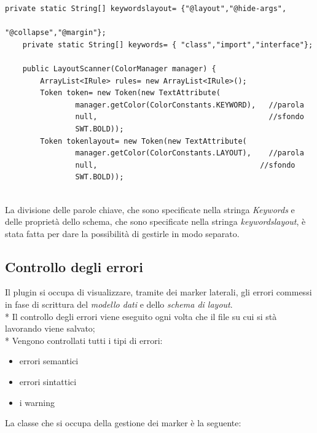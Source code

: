 \begin{lstlisting}[caption={LayoutScanner}, style={java}]
	private static String[] keywordslayout= {"@layout","@hide-args",
												"@collapse","@margin"};
	private static String[] keywords= { "class","import","interface"};
	
	public LayoutScanner(ColorManager manager) {
		ArrayList<IRule> rules= new ArrayList<IRule>();
		Token token= new Token(new TextAttribute(
				manager.getColor(ColorConstants.KEYWORD), 	//parola
				null,                                       //sfondo
				SWT.BOLD));
		Token tokenlayout= new Token(new TextAttribute(
				manager.getColor(ColorConstants.LAYOUT), 	//parola
				null,                                     //sfondo
				SWT.BOLD));
		
\end{lstlisting}

La divisione delle parole chiave, che sono specificate nella stringa 
\emph{Keywords} e delle proprietà dello schema, che sono specificate nella
stringa \emph{keywordslayout},  è stata fatta per dare la possibilità di gestirle in modo separato.


\subsection{Controllo degli errori} 
Il plugin si occupa di visualizzare, tramite dei marker laterali, gli errori 
commessi in fase di scrittura del \emph{modello dati} e dello \emph{schema di
layout}. \\*
Il controllo degli errori viene eseguito ogni volta che il file su cui si stà lavorando
viene salvato; \\*
Vengono controllati tutti i tipi di errori:
\begin{itemize}
  \item errori semantici
  \item errori sintattici
  \item i warning
\end{itemize} 

La classe che si occupa della gestione dei marker è la seguente:

